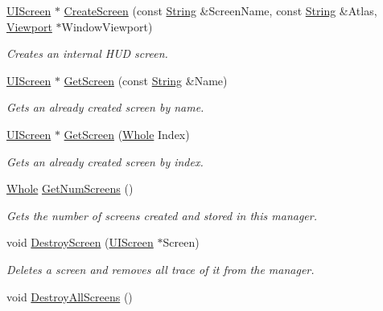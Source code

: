 \begin{DoxyCompactItemize}
\hyperlink{classphys_1_1UIScreen}{UIScreen} $\ast$ \hyperlink{classphys_1_1UIManager_ad3cdb8a52d0907fbb6e312faf4293301}{CreateScreen} (const \hyperlink{namespacephys_aa03900411993de7fbfec4789bc1d392e}{String} \&ScreenName, const \hyperlink{namespacephys_aa03900411993de7fbfec4789bc1d392e}{String} \&Atlas, \hyperlink{classphys_1_1Viewport}{Viewport} $\ast$WindowViewport)
\begin{DoxyCompactList}\small\item\em Creates an internal HUD screen. \item\end{DoxyCompactList}\item 
\hyperlink{classphys_1_1UIScreen}{UIScreen} $\ast$ \hyperlink{classphys_1_1UIManager_a8cd693c7ec9c458fcc4169eea0d7b4db}{GetScreen} (const \hyperlink{namespacephys_aa03900411993de7fbfec4789bc1d392e}{String} \&Name)
\begin{DoxyCompactList}\small\item\em Gets an already created screen by name. \item\end{DoxyCompactList}\item 
\hyperlink{classphys_1_1UIScreen}{UIScreen} $\ast$ \hyperlink{classphys_1_1UIManager_a6083b86b2e240cc316e8ca87479d15a8}{GetScreen} (\hyperlink{namespacephys_a460f6bc24c8dd347b05e0366ae34f34a}{Whole} Index)
\begin{DoxyCompactList}\small\item\em Gets an already created screen by index. \item\end{DoxyCompactList}\item 
\hyperlink{namespacephys_a460f6bc24c8dd347b05e0366ae34f34a}{Whole} \hyperlink{classphys_1_1UIManager_a3bd28c361f6fc79a182ebd3ec0a26ec7}{GetNumScreens} ()
\begin{DoxyCompactList}\small\item\em Gets the number of screens created and stored in this manager. \item\end{DoxyCompactList}\item 
void \hyperlink{classphys_1_1UIManager_a5afab78f58a6531fc18771f5a4eeccf8}{DestroyScreen} (\hyperlink{classphys_1_1UIScreen}{UIScreen} $\ast$Screen)
\begin{DoxyCompactList}\small\item\em Deletes a screen and removes all trace of it from the manager. \item\end{DoxyCompactList}\item 
\hypertarget{classphys_1_1UIManager_a97555e02aad6c85cac6bf67fbe074cd1}{
void \hyperlink{classphys_1_1UIManager_a97555e02aad6c85cac6bf67fbe074cd1}{DestroyAllScreens} ()}
\label{d5/dc5/classphys_1_1UIManager_a97555e02aad6c85cac6bf67fbe074cd1}


\end{DoxyCompactItemize}
